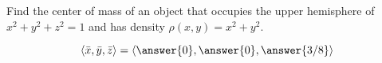 \documentclass{ximera}
\author{David Guichard \and Neal Koblitz \and H. Jerome Keisler \and Albert Scheller \and Barry Balof \and Mike Wills \and Matthew Carr}
\begin{document}
\begin{exercise}




Find the center of mass of an object that occupies the upper hemisphere of $x^2+y^2+z^2=1$ and has density $\rho(x,y)=x^2+y^2$. 

\begin{prompt}
\[
\vector{\bar{x},\bar{y},\bar{z}}=\vector{\answer{0},\answer{0},\answer{3/8}}
\]
\end{prompt}


\end{exercise}
\end{document}
